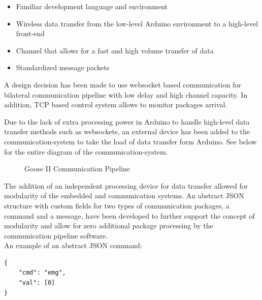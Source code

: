 \documentclass[11pt,a4paper,oldfontcommands]{memoir}
\begin{document}
\begin{itemize}
    \item Familiar development language and environment
    \item Wireless data transfer from the low-level Arduino environment to a high-level front-end
    \item Channel that allows for a fast and high volume transfer of data
    \item Standardized message packets
\end{itemize}

A design decision has been made to use websocket based communication for bilateral communication pipeline with low delay and high channel capacity. In addition, TCP based control system allows to monitor packages arrival.

Due to the lack of extra processing power in Arduino to handle high-level data transfer methods such as websockets, an external device has been added to the communication-system to take the load of data transfer form Arduino. See below for the entire diagram of the communication-system.

\bigskip
\begin{figure}[htbp]
\centering
{}
\caption{\label{fig:comm_pipeline} Goose II Communication Pipeline}
\end{figure}
\bigskip

The addition of an independent processing device for data transfer allowed for modularity of the embedded and communication systems. An abstract JSON structure with custom fields for two types of communication packages, a command and a message, have been developed to further support the concept of modularity and allow for zero additional package processing by the communication pipeline software.\\

An example of an abstract JSON command:
\bigskip
\begin{lstlisting}
{
    "cmd": "emg",
    "val": [0]
}
\end{lstlisting}
\bigskip
\end{document}
